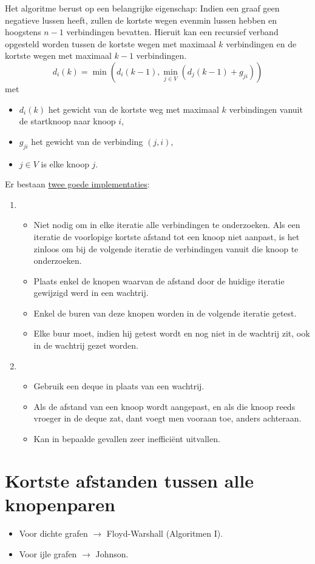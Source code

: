 Het algoritme berust op een belangrijke eigenschap: Indien een graaf geen negatieve lussen heeft, zullen de kortste wegen evenmin lussen hebben en hoogstens $n - 1$ verbindingen bevatten. Hieruit kan een recursief verband opgesteld worden tussen de kortste wegen met maximaal $k$ verbindingen en de kortste wegen met maximaal $k - 1$ verbindingen.
$$d_i(k) = \min(d_i(k - 1), \min\limits_{j \in V} (d_j(k - 1) + g_{ji}))$$
met
\begin{itemize}
	\item $d_i(k)$ het gewicht van de kortste weg met maximaal $k$ verbindingen vanuit de startknoop naar knoop $i$,
	\item $g_{ji}$ het gewicht van de verbinding $(j, i)$,
	\item $j \in V$ is elke knoop $j$.
\end{itemize}




Er bestaan \underline{twee goede implementaties}:
\begin{enumerate}
	\item \begin{itemize}
		\item  Niet nodig om in elke iteratie alle verbindingen te onderzoeken. Als een iteratie de voorlopige kortste afstand tot een knoop niet aanpast, is het zinloos om bij de volgende iteratie de verbindingen vanuit die knoop te onderzoeken.
		\item  Plaats enkel de knopen waarvan de afstand door de huidige iteratie gewijzigd werd in een wachtrij.
		\item  Enkel de buren van deze knopen worden in de volgende iteratie getest.
		\item  Elke buur moet, indien hij getest wordt en nog niet in de wachtrij zit, ook in de wachtrij gezet worden.
	\end{itemize}
	\item \begin{itemize}
		\item Gebruik een deque in plaats van een wachtrij.
		\item Als de afstand van een knoop wordt aangepast, en als die knoop reeds vroeger in de deque zat, dant voegt men vooraan toe, anders achteraan.
		\item Kan in bepaalde gevallen zeer inefficiënt uitvallen.
	\end{itemize}

\end{enumerate}

\section{Kortste afstanden tussen alle knopenparen}
\begin{itemize}
	\item Voor dichte grafen $\rightarrow$ Floyd-Warshall (Algoritmen I).
	\item Voor ijle grafen $\rightarrow$ Johnson.
\end{itemize}
